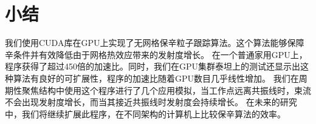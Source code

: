 \section{小结}                \label{section:conclusion}
我们使用CUDA库在GPU上实现了无网格保辛粒子跟踪算法。这个算法能够保障辛条件并有效降低由于网格热效应带来的发射度增长。
在一个普通家用GPU上，程序获得了超过450倍的加速比。同时，我们在GPU集群泰坦上的测试还显示出这种算法有良好的可扩展性，程序的加速比随着GPU数目几乎线性增加。
我们在周期性聚焦结构中使用这个程序进行了几个应用模拟，当工作点远离共振线时，束流不会出现发射度增长，而当其接近共振线时发射度会持续增长。
在未来的研究中，我们将继续扩展此程序，在不同架构的计算机上比较保辛算法的效率。